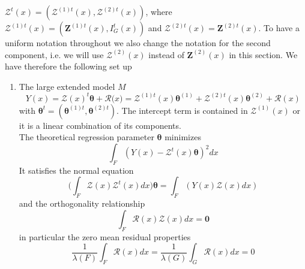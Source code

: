 \documentclass[a4paper,12pt,leqno, titlepage]{article}
\begin{document}
{$\pmb{\mathcal{Z}}^t(x)=(\pmb{\mathcal{Z}}^{(1)t}(x),\pmb{\mathcal{Z}}^{(2)t}(x))$,
where $\pmb{\mathcal{Z}}^{(1)t}(x)=(\pmb{Z}^{(1)t}(x), I_G^t(x))$ and $\pmb{\mathcal{Z}}^{(2)t}(x)=\pmb{Z}^{(2)t}(x)$. To have a uniform notation throughout we also change the notation for the second component, i.e. we will use $\pmb{\mathcal{Z}}^{(2)}(x)$ instead of $\pmb{Z}^{(2)}(x)$ in this section. We have therefore the following set up

\begin{enumerate}
 \item
 The large extended model $M$
 $$ Y(x)=\pmb{\mathcal{Z}}(x)^t\pmb{\theta}+ \mathcal{R(}x)=\pmb{\mathcal{Z}}^{(1)t}(x)\pmb{\theta}^{(1)}
 +\pmb{\mathcal{Z}}^{(2)t}(x)\pmb{\theta}^{(2)}+ \mathcal{R}(x)$$
 \noindent with $\pmb{\theta}^t=({\pmb{\theta}^{(1)t}}, {\pmb{\theta}^{(2)t}})$.
 The intercept term is contained in $\pmb{\mathcal{Z}}^{(1)}(x)$ or it is a linear combination of its components.\\
 The theoretical regression parameter $\pmb{\theta}$ minimizes
 $$\int_F (Y(x)-\pmb{\mathcal{Z}}^t(x)\pmb{\theta})^2dx$$
 It satisfies the normal equation
 $$\big(\int_F \pmb{\mathcal{Z}}(x)\pmb{\mathcal{Z}}^t(x)dx\big)\pmb{\theta}
 =\int_F(Y(x)\pmb{\mathcal{Z}}(x)dx)$$ and the orthogonality relationship
 $$\int_F \mathcal{R}(x)\pmb{\mathcal{Z}}(x)dx=\pmb{0}$$
 \noindent in particular the zero mean residual properties
 $$ \frac{1}{\lambda(F)}\int_F \mathcal{R}(x)dx=\frac{1}{\lambda(G)}\int_G \mathcal{R}(x)dx=0$$


\end{enumerate}}
\end{document}
